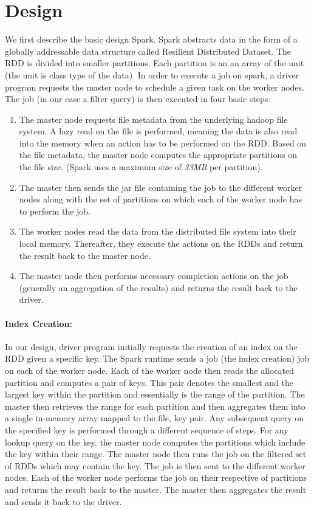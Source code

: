 \section{Design} 
\label{sec:design}
We first describe the basic design Spark. Spark abstracts data in the form of a globally addressable data structure called Resilient Distributed Dataset. The RDD is divided into smaller partitions. Each partition is an an array of the unit (the unit is class type of the data).  In order to execute a job on spark, a driver program requests the master node to schedule a given task on the worker nodes. The job (in our case a filter query) is then executed in  four basic steps: 
\begin{enumerate}
\item The master node requests file metadata from the underlying hadoop file system. A lazy read on the file is performed, meaning the data is also read into the memory when an action has to be performed on the RDD. Based on the file metadata, the master node computes the appropriate partitions on the file size. (Spark uses a maximum size of \textit{33MB} per partition). 
\item The master then sends the jar file containing the job to the different worker nodes along with the set of partitions on which each of the worker node has to perform the job. 
\item The worker nodes read the data from the distributed file system into their local memory. Thereafter, they execute the actions on the RDDs and return the result back to the master node.
\item The master node then performs necessary completion actions on the job (generally an aggregation of the results) and returns the result back to the driver.
\end{enumerate}
\paragraph{Index Creation:}
In our design, driver program initially requests the creation of an index on the RDD given a specific key. The Spark runtime sends a job (the index creation) job on each of the worker node. Each of the worker node then reads the allocated partition and computes a pair of keys. This pair denotes the smallest and the largest key within the partition and essentially is the range of the partition. The master then retrieves the range for each partition and then aggregates them into a single in-memory array mapped to the file, key pair. Any subsequent query on the specified key is performed through a different sequence of steps. 
	For any lookup query on the key, the master node computes the partitions which include the key within their range. The master node then runs the job on the filtered set of RDDs which may contain the key. The job is then sent to the different worker nodes. Each of the worker node performs the job on their respective of partitions and returns the result back to the master. The master then aggregates the result and sends it back to the driver. 
